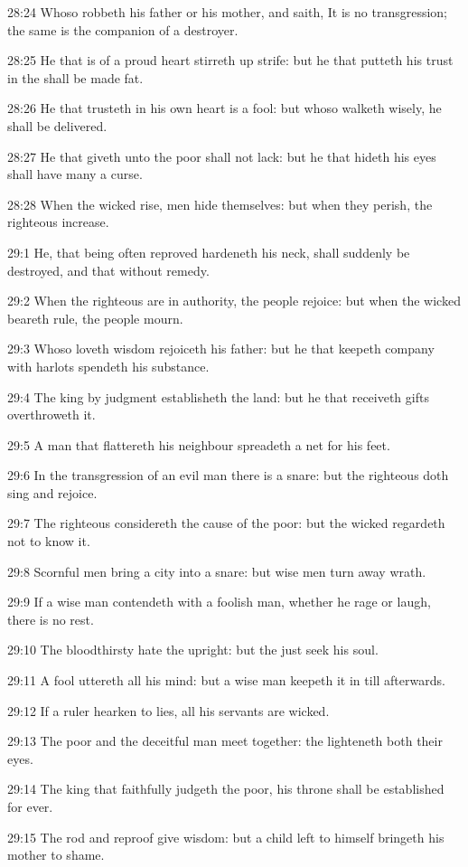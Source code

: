28:24 Whoso robbeth his father or his mother, and saith, It is no transgression; the same is the companion of a destroyer.

28:25 He that is of a proud heart stirreth up strife: but he that putteth his trust in the \LORD shall be made fat.

28:26 He that trusteth in his own heart is a fool: but whoso walketh wisely, he shall be delivered.

28:27 He that giveth unto the poor shall not lack: but he that hideth his eyes shall have many a curse.

28:28 When the wicked rise, men hide themselves: but when they perish, the righteous increase.

29:1 He, that being often reproved hardeneth his neck, shall suddenly be destroyed, and that without remedy.

29:2 When the righteous are in authority, the people rejoice: but when the wicked beareth rule, the people mourn.

29:3 Whoso loveth wisdom rejoiceth his father: but he that keepeth company with harlots spendeth his substance.

29:4 The king by judgment establisheth the land: but he that receiveth gifts overthroweth it.

29:5 A man that flattereth his neighbour spreadeth a net for his feet.

29:6 In the transgression of an evil man there is a snare: but the righteous doth sing and rejoice.

29:7 The righteous considereth the cause of the poor: but the wicked regardeth not to know it.

29:8 Scornful men bring a city into a snare: but wise men turn away wrath.

29:9 If a wise man contendeth with a foolish man, whether he rage or laugh, there is no rest.

29:10 The bloodthirsty hate the upright: but the just seek his soul.

29:11 A fool uttereth all his mind: but a wise man keepeth it in till afterwards.

29:12 If a ruler hearken to lies, all his servants are wicked.

29:13 The poor and the deceitful man meet together: the \LORD lighteneth both their eyes.

29:14 The king that faithfully judgeth the poor, his throne shall be established for ever.

29:15 The rod and reproof give wisdom: but a child left to himself bringeth his mother to shame.

